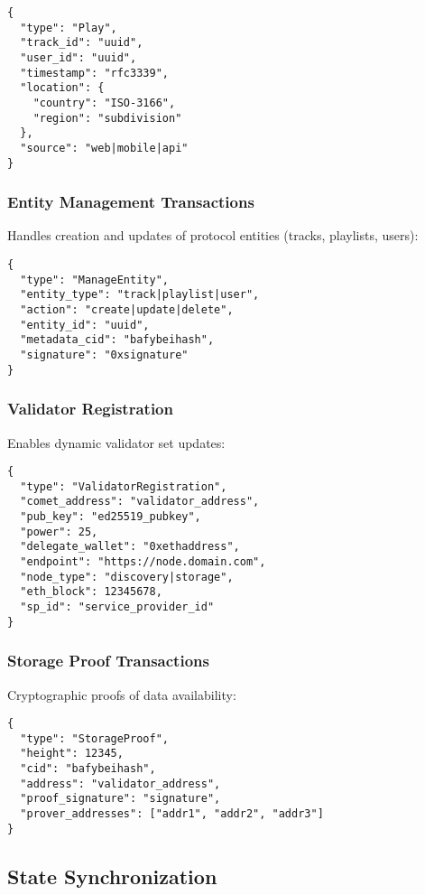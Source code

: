 \documentclass[11pt,a4paper]{article}
\begin{document}
\begin{lstlisting}[caption=Play Transaction Structure]
{
  "type": "Play",
  "track_id": "uuid",
  "user_id": "uuid",
  "timestamp": "rfc3339",
  "location": {
    "country": "ISO-3166",
    "region": "subdivision"
  },
  "source": "web|mobile|api"
}
\end{lstlisting}

\subsubsection{Entity Management Transactions}
Handles creation and updates of protocol entities (tracks, playlists, users):

\begin{lstlisting}[caption=Entity Management Transaction]
{
  "type": "ManageEntity",
  "entity_type": "track|playlist|user",
  "action": "create|update|delete",
  "entity_id": "uuid",
  "metadata_cid": "bafybeihash",
  "signature": "0xsignature"
}
\end{lstlisting}

\subsubsection{Validator Registration}
Enables dynamic validator set updates:

\begin{lstlisting}[caption=Validator Registration]
{
  "type": "ValidatorRegistration",
  "comet_address": "validator_address",
  "pub_key": "ed25519_pubkey",
  "power": 25,
  "delegate_wallet": "0xethaddress",
  "endpoint": "https://node.domain.com",
  "node_type": "discovery|storage",
  "eth_block": 12345678,
  "sp_id": "service_provider_id"
}
\end{lstlisting}

\subsubsection{Storage Proof Transactions}
Cryptographic proofs of data availability:

\begin{lstlisting}[caption=Storage Proof Transaction]
{
  "type": "StorageProof",
  "height": 12345,
  "cid": "bafybeihash",
  "address": "validator_address",
  "proof_signature": "signature",
  "prover_addresses": ["addr1", "addr2", "addr3"]
}
\end{lstlisting}

\subsection{State Synchronization}
\end{document}

